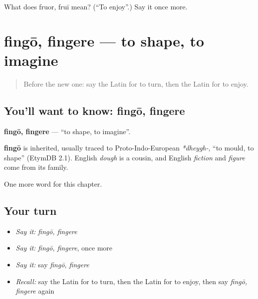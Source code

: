 \begin{tcolorbox}[breakable,colback=teal!4,colframe=teal!35!black,title={Before you move on}]
What does fruor, fruī mean? (\textquotedblleft{}To enjoy\textquotedblright{}.) Say it once more.
\end{tcolorbox}
\section[fingō, fingere]{fingō, fingere — to shape, to imagine}

\label{lesson:LA-C231-fingo}



\begin{quote}
Before the new one: say the Latin for to turn, then the Latin for to enjoy.
\end{quote}

\subsection*{You'll want to know: fingō, fingere}
\textbf{fingō, fingere} — \textquotedblleft{}to shape, to imagine\textquotedblright{}.

\begin{cousinweb}
\textbf{fingō} is inherited, usually traced to Proto-Indo-European \emph{*dheygh-}, \textquotedblleft{}to mould, to shape\textquotedblright{} (EtymDB 2.1). English \emph{dough} is a cousin, and English \emph{fiction} and \emph{figure} come from its family.
\end{cousinweb}

\begin{grammarlens}[title={What you've built}]
One more word for this chapter.
\end{grammarlens}

\subsection*{Your turn}
\begin{itemize}
\raggedright
  \item \emph{Say it:} \emph{fingō, fingere}
  \item \emph{Say it:} \emph{fingō, fingere}, once more
  \item \emph{Say it:} say \emph{fingō, fingere}
  \item \emph{Recall:} say the Latin for to turn, then the Latin for to enjoy, then say \emph{fingō, fingere} again
\end{itemize}

